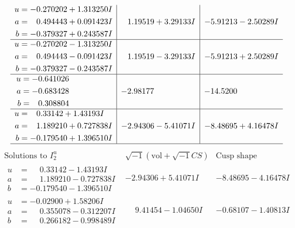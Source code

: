 \documentclass[1p]{elsarticle_modified}
\theoremstyle{definition}
\newcommand{\I}{\sqrt{-1}}
\begin{document}
$$\begin{array}{c|c|c}
\begin{aligned}
u &= -0.270202 + 1.313250 I \\
a &= \phantom{-}0.494443 + 0.091423 I \\
b &= -0.379327 + 0.243587 I\end{aligned}
 & \phantom{-}1.19519 + 3.29133 I & -5.91213 - 2.50289 I \\ \hline\begin{aligned}
u &= -0.270202 - 1.313250 I \\
a &= \phantom{-}0.494443 - 0.091423 I \\
b &= -0.379327 - 0.243587 I\end{aligned}
 & \phantom{-}1.19519 - 3.29133 I & -5.91213 + 2.50289 I \\ \hline\begin{aligned}
u &= -0.641026\phantom{ +0.000000I} \\
a &= -0.683428\phantom{ +0.000000I} \\
b &= \phantom{-}0.308804\phantom{ +0.000000I}\end{aligned}
 & -2.98177\phantom{ +0.000000I} & -14.5200\phantom{ +0.000000I} \\ \hline\begin{aligned}
u &= \phantom{-}0.33142 + 1.43193 I \\
a &= \phantom{-}1.189210 + 0.727838 I \\
b &= -0.179540 + 1.396510 I\end{aligned}
 & -2.94306 - 5.41071 I & -8.48695 + 4.16478 I\\
 \hline 
 \end{array}$$\newpage$$\begin{array}{c|c|c}  
\text{Solutions to }I^u_{2}& \I (\text{vol} + \sqrt{-1}CS) & \text{Cusp shape}\\
 \hline 
\begin{aligned}
u &= \phantom{-}0.33142 - 1.43193 I \\
a &= \phantom{-}1.189210 - 0.727838 I \\
b &= -0.179540 - 1.396510 I\end{aligned}
 & -2.94306 + 5.41071 I & -8.48695 - 4.16478 I \\ \hline\begin{aligned}
u &= -0.02900 + 1.58206 I \\
a &= \phantom{-}0.355078 - 0.312207 I \\
b &= \phantom{-}0.266182 - 0.998489 I\end{aligned}
 & \phantom{-}9.41454 - 1.04650 I & -0.68107 - 1.40813 I \\ \hline\begin{aligned}

\end{aligned}
\end{array}$$
\end{document}
